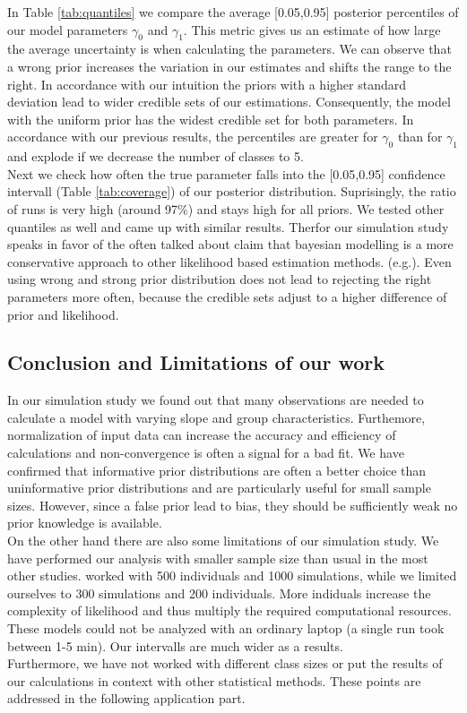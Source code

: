 In Table \ref{tab:quantiles} we compare the average [0.05,0.95] posterior percentiles of our model parameters $\gamma_0$ and $\gamma_1$. 
This metric gives us an estimate of how large the average uncertainty is when calculating the parameters. We can observe that a wrong prior increases the variation in our estimates and shifts the range to the right. 
In accordance with our intuition the priors with a higher standard deviation lead to wider credible sets of our estimations. Consequently, the model with the uniform prior has the widest credible set for both parameters. In accordance with our previous results, the percentiles are greater for $\gamma_0$ than for $\gamma_1$ and explode if we decrease the number of classes to 5.\\
Next we check how often the true parameter falls into the [0.05,0.95] confidence intervall (Table \ref{tab:coverage}) of our posterior distribution. Suprisingly, the ratio of runs is very high (around 97\%) and stays high for all priors.
We tested other quantiles as well and came up with similar results. Therfor our simulation study speaks in favor of the often talked about claim that bayesian modelling is a more conservative approach to other likelihood based estimation methods.  (e.g.\cite{stegmueller2013}). Even using wrong and strong prior distribution does not lead to rejecting the right parameters more often, because the credible sets adjust to a higher difference of prior and likelihood.

\subsection{Conclusion and Limitations of our work}

In our simulation study we found out that many observations are needed to calculate a model with varying slope and group characteristics. Furthemore, normalization of input data can increase the accuracy and efficiency of calculations and non-convergence is often a signal for a bad fit. We have confirmed that informative prior distributions are often a better choice than uninformative prior distributions and are particularly useful for small sample sizes. However, since a false prior lead to bias, they should be sufficiently weak no prior knowledge is available.\\
On the other hand there are also some limitations of our simulation study. We have performed our analysis with smaller sample size than usual in the most other studies. \cite{stegmueller2013} worked with 500 individuals and 1000 simulations, while we limited ourselves to 300 simulations and 200 individuals. More indiduals increase the complexity of likelihood and thus multiply the required computational resources. These models could not be analyzed with an ordinary laptop (a single run took between 1-5 min). Our intervalls are much wider as a results. \\
Furthermore, we have not worked with different class sizes or put the results of our calculations in context with other statistical methods. These points are addressed in the following application part.




